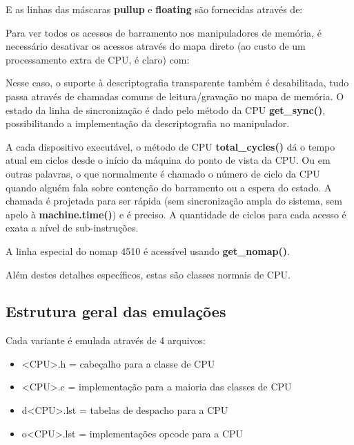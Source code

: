 \documentclass[letterpaper,10pt,brazil]{sphinxmanual}
\begin{document}
E as linhas das máscaras \textbf{pullup} e \textbf{floating} são fornecidas
através de:
\begin{quote}

\end{quote}

Para ver todos os acessos de barramento nos manipuladores de memória,
é necessário desativar os acessos através do mapa direto (ao custo de
um processamento extra de CPU, é claro) com:
\begin{quote}

\end{quote}

Nesse caso, o suporte à descriptografia transparente também é
desabilitada, tudo passa através de chamadas comuns de leitura/gravação
no mapa de memória. O estado da linha de sincronização é dado pelo
método da CPU \textbf{get\_sync()}, possibilitando a implementação da
descriptografia no manipulador.

A cada dispositivo executável, o método de CPU \textbf{total\_cycles()} dá o
tempo atual em ciclos desde o início da máquina do ponto de vista da
CPU. Ou em outras palavras, o que normalmente é chamado o número de
ciclo da CPU quando alguém fala sobre contenção do barramento ou a
espera do estado. A chamada é projetada para ser rápida (sem
sincronização ampla do sistema, sem apelo à \textbf{machine.time()}) e é
preciso. A quantidade de ciclos para cada acesso é exata a nível de
sub-instruções.

A linha especial do nomap 4510 é acessível usando \textbf{get\_nomap()}.

Além destes detalhes específicos, estas são classes normais de CPU.


\subsection{Estrutura geral das emulações}
\label{techspecs/m6502:estrutura-geral-das-emulacoes}
Cada variante é emulada através de 4 arquivos:
\begin{itemize}
\item {} 
\textless{}CPU\textgreater{}.h    = cabeçalho para a classe de CPU

\item {} 
\textless{}CPU\textgreater{}.c    = implementação para a maioria das classes de CPU

\item {} 
d\textless{}CPU\textgreater{}.lst = tabelas de despacho para a CPU

\item {} 
o\textless{}CPU\textgreater{}.lst = implementações opcode para a CPU

\end{itemize}
\end{document}
